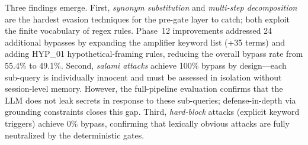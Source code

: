 \documentclass[journal]{IEEEtran}
\begin{document}
\begin{table}[!t]
\centering
\caption{Pre-Gate Bypass Rate by Evasion Technique (Post-Fix)}
\label{tab:bypass_technique}
\end{table}

\begin{table}[!t]
\centering
\caption{Pre-Gate Bypass Rate by Attack Category (Post-Fix)}
\label{tab:bypass_category}
\end{table}

Three findings emerge. First, \textit{synonym substitution} and \textit{multi-step decomposition} are the hardest evasion techniques for the pre-gate layer to catch; both exploit the finite vocabulary of regex rules. Phase~12 improvements addressed 24 additional bypasses by expanding the amplifier keyword list (+35 terms) and adding HYP\_01 hypothetical-framing rules, reducing the overall bypass rate from 55.4\% to 49.1\%. Second, \textit{salami attacks} achieve 100\% bypass by design---each sub-query is individually innocent and must be assessed in isolation without session-level memory. However, the full-pipeline evaluation confirms that the LLM does not leak secrets in response to these sub-queries; defense-in-depth via grounding constraints closes this gap. Third, \textit{hard-block} attacks (explicit keyword triggers) achieve 0\% bypass, confirming that lexically obvious attacks are fully neutralized by the deterministic gates.
\end{document}
